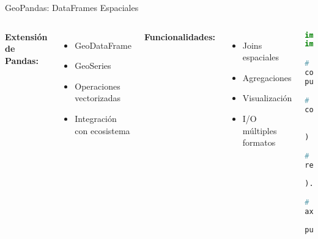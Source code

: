 \documentclass[10pt]{beamer}
\begin{document}
\begin{frame}[fragile]{GeoPandas: DataFrames Espaciales}
    \begin{columns}
        \textbf{Extensión de Pandas:}
        \begin{itemize}
            \item GeoDataFrame
            \item GeoSeries
            \item Operaciones vectorizadas
            \item Integración con ecosistema
        \end{itemize}
        
        \textbf{Funcionalidades:}
        \begin{itemize}
            \item Joins espaciales
            \item Agregaciones
            \item Visualización
            \item I/O múltiples formatos
        \end{itemize}
        
        \begin{lstlisting}[language=Python, caption=GeoPandas workflow]
import geopandas as gpd
import matplotlib.pyplot as plt

# Cargar datos
comunas = gpd.read_file('comunas.shp')
puntos = gpd.read_file('colegios.geojson')

# Join espacial
colegios_por_comuna = gpd.sjoin(
    puntos, comunas, 
    predicate='within'
)

# Agregación
resumen = colegios_por_comuna.groupby(
    'COMUNA'
).size()

# Visualización
ax = comunas.plot(column='POBLACION',
                  legend=True)
puntos.plot(ax=ax, color='red', 
           markersize=2)
        \end{lstlisting}
    \end{columns}
\end{frame}
\end{document}
